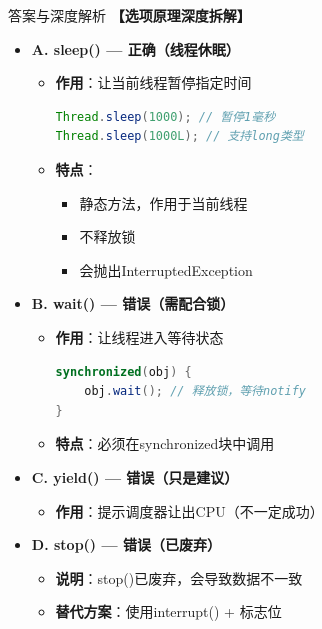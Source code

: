 \documentclass[12pt, a4paper]{ctexart}
\begin{document}
\begin{enumerate}[label=\textbf{\arabic*.}]
\begin{bluebox}{答案与深度解析}
		      \textbf{【选项原理深度拆解】}
					  \begin{itemize}[label={}, leftmargin=*, nosep]

		      \item \textbf{A. sleep() — 正确（线程休眠）}
		      \begin{itemize}[label={}, leftmargin=*, nosep]
			      \item \textbf{作用}：让当前线程暂停指定时间
			            \begin{lstlisting}[language=Java]
Thread.sleep(1000); // 暂停1毫秒
Thread.sleep(1000L); // 支持long类型
      \end{lstlisting}
			      \item \textbf{特点}：
			            \begin{itemize}[label={}, nosep]
				            \item 静态方法，作用于当前线程
				            \item 不释放锁
				            \item 会抛出InterruptedException
			            \end{itemize}
		      \end{itemize}

		      \item \textbf{B. wait() — 错误（需配合锁）}
		      \begin{itemize}[label={}, leftmargin=*, nosep]
			      \item \textbf{作用}：让线程进入等待状态
			            \begin{lstlisting}[language=Java]
synchronized(obj) {
    obj.wait(); // 释放锁，等待notify
}
      \end{lstlisting}
			      \item \textbf{特点}：必须在synchronized块中调用
		      \end{itemize}

		      \item \textbf{C. yield() — 错误（只是建议）}
		      \begin{itemize}[label={}, leftmargin=*, nosep]
			      \item \textbf{作用}：提示调度器让出CPU（不一定成功）
		      \end{itemize}

		      \item \textbf{D. stop() — 错误（已废弃）}
		      \begin{itemize}[label={}, leftmargin=*, nosep]
			      \item \textbf{说明}：stop()已废弃，会导致数据不一致
			      \item \textbf{替代方案}：使用interrupt() + 标志位
		      \end{itemize}


\end{itemize}
\end{bluebox}
\end{enumerate}
\end{document}
